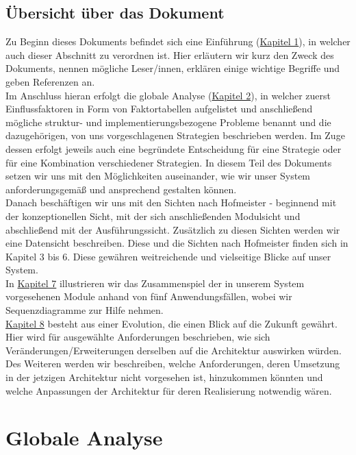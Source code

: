 \documentclass[enabledeprecatedfontcommands,fontsize=11pt,paper=a4,twoside]{scrartcl}
\newcounter{one}
\begin{document}
	\subsection{Übersicht über das Dokument}
	Zu Beginn dieses Dokuments befindet sich eine Einführung (\hyperref[sec:intro]{Kapitel 1}), in welcher auch dieser Abschnitt zu verordnen ist. Hier erläutern wir kurz den Zweck des Dokuments, nennen mögliche Leser/innen, erklären einige wichtige Begriffe und geben Referenzen an.  \\
	Im Anschluss hieran erfolgt die globale Analyse (\hyperref[sec:globale_analyse]{Kapitel 2}), in welcher zuerst Einflussfaktoren in Form von Faktortabellen aufgelistet und anschließend mögliche struktur- und implementierungsbezogene Probleme benannt und die dazugehörigen, von uns vorgeschlagenen Strategien beschrieben werden. Im Zuge dessen erfolgt jeweils auch eine begründete Entscheidung für eine Strategie oder für eine Kombination verschiedener Strategien. In diesem Teil des Dokuments setzen wir uns mit den Möglichkeiten auseinander, wie wir unser System anforderungsgemäß und ansprechend gestalten können. \\
	Danach beschäftigen wir uns mit den Sichten nach Hofmeister - beginnend mit der konzeptionellen Sicht, mit der sich anschließenden Modulsicht und abschließend mit der Ausführungssicht. Zusätzlich zu diesen Sichten werden wir eine Datensicht beschreiben. Diese und die Sichten nach Hofmeister finden sich in Kapitel 3 bis 6. Diese gewähren weitreichende und vielseitige Blicke auf unser System. \\
	In \hyperref[sec:anwendungsfaelle]{Kapitel 7} illustrieren wir das Zusammenspiel der in unserem System vorgesehenen Module anhand von fünf Anwendungsfällen, wobei wir Sequenzdiagramme zur Hilfe nehmen. \\
	\hyperref[sec:evolution]{Kapitel 8} besteht aus einer Evolution, die einen Blick auf die Zukunft gewährt. Hier wird für ausgewählte Anforderungen beschrieben, wie sich Veränderungen/Erweiterungen derselben auf die Architektur auswirken würden. Des Weiteren werden wir beschreiben, welche Anforderungen, deren Umsetzung in der jetzigen Architektur nicht vorgesehen ist, hinzukommen könnten und welche Anpassungen der Architektur für deren Realisierung notwendig wären.
	
	
	\newpage
	\section{Globale Analyse}
	\label{sec:globale_analyse}
	
\end{document}
